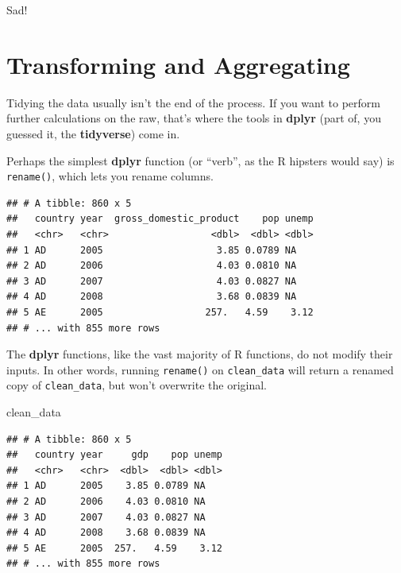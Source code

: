 \documentclass[12pt,oneside,openany]{book}
\newenvironment{Shaded}{\begin{snugshade}}{\end{snugshade}}
\newcommand{\KeywordTok}[1]{\textcolor[rgb]{0.13,0.29,0.53}{\textbf{#1}}}
\newcommand{\DataTypeTok}[1]{\textcolor[rgb]{0.13,0.29,0.53}{#1}}
\newcommand{\StringTok}[1]{\textcolor[rgb]{0.31,0.60,0.02}{#1}}
\newcommand{\OperatorTok}[1]{\textcolor[rgb]{0.81,0.36,0.00}{\textbf{#1}}}
\newcommand{\NormalTok}[1]{#1}
\begin{document}
Sad!

\section{Transforming and
Aggregating}\label{transforming-and-aggregating}

Tidying the data usually isn't the end of the process. If you want to
perform further calculations on the raw, that's where the tools in
\textbf{dplyr} (part of, you guessed it, the \textbf{tidyverse}) come
in.

Perhaps the simplest \textbf{dplyr} function (or ``verb'', as the R
hipsters would say) is \texttt{rename()}, which lets you rename columns.

\begin{Shaded}
\end{Shaded}

\begin{verbatim}
## # A tibble: 860 x 5
##   country year  gross_domestic_product    pop unemp
##   <chr>   <chr>                  <dbl>  <dbl> <dbl>
## 1 AD      2005                    3.85 0.0789 NA   
## 2 AD      2006                    4.03 0.0810 NA   
## 3 AD      2007                    4.03 0.0827 NA   
## 4 AD      2008                    3.68 0.0839 NA   
## 5 AE      2005                  257.   4.59    3.12
## # ... with 855 more rows
\end{verbatim}

The \textbf{dplyr} functions, like the vast majority of R functions, do
not modify their inputs. In other words, running \texttt{rename()} on
\texttt{clean\_data} will return a renamed copy of \texttt{clean\_data},
but won't overwrite the original.

\begin{Shaded}
\begin{Highlighting}[]
\NormalTok{clean_data}
\end{Highlighting}
\end{Shaded}

\begin{verbatim}
## # A tibble: 860 x 5
##   country year     gdp    pop unemp
##   <chr>   <chr>  <dbl>  <dbl> <dbl>
## 1 AD      2005    3.85 0.0789 NA   
## 2 AD      2006    4.03 0.0810 NA   
## 3 AD      2007    4.03 0.0827 NA   
## 4 AD      2008    3.68 0.0839 NA   
## 5 AE      2005  257.   4.59    3.12
## # ... with 855 more rows
\end{verbatim}
\end{document}
